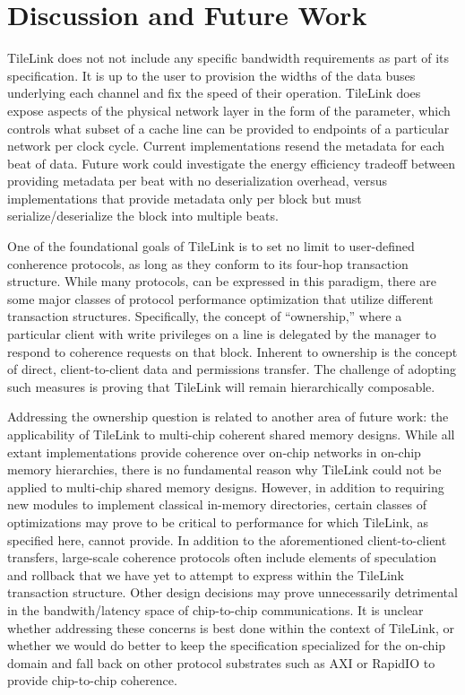 \section{Discussion and Future Work}

TileLink does not not include any specific bandwidth requirements as part of its specification.
It is up to the user to provision the widths of the data buses underlying each channel and fix the speed of their operation.  
TileLink does expose aspects of the physical network layer in the form of the  parameter, which
controls what subset of a cache line can be provided to endpoints of a particular network per clock cycle.
Current implementations resend the metadata for each beat of data.
Future work could investigate the energy efficiency tradeoff between providing metadata per beat with no deserialization overhead,
versus implementations that provide metadata only per block but must serialize/deserialize the block into multiple beats. 

One of the foundational goals of TileLink is to set no limit to user-defined conherence protocols, as long as they conform to
its four-hop transaction structure.
While many protocols, can be expressed in this paradigm, there are some major classes of protocol performance optimization that
utilize different transaction structures.
Specifically, the concept of ``ownership,'' where a particular client with write privileges on a line is delegated by the manager
to respond to coherence requests on that block.
Inherent to ownership is the concept of direct, client-to-client data and permissions transfer.
The challenge of adopting such measures is proving that TileLink will remain hierarchically composable.

Addressing the ownership question is related to another area of future work:
the applicability of TileLink to multi-chip coherent shared memory designs.
While all extant implementations provide coherence over on-chip networks in on-chip memory hierarchies,
there is no fundamental reason why TileLink could not be applied to multi-chip shared memory designs.
However, in addition to requiring new modules to implement classical in-memory directories,
certain classes of optimizations may prove to be critical to performance for which TileLink, as specified here, cannot provide.
In addition to the aforementioned client-to-client transfers, large-scale coherence protocols often include
elements of speculation and rollback that we have yet to attempt to express within the TileLink transaction structure.
Other design decisions may prove unnecessarily detrimental in the bandwith/latency space of chip-to-chip communications.
It is unclear whether addressing these concerns is best done within the context of TileLink, or whether we would
do better to keep the specification specialized for the on-chip domain and fall back on other
protocol substrates such as AXI or RapidIO to provide chip-to-chip coherence. 

